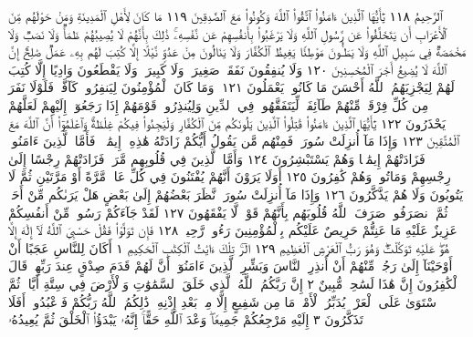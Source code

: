 ٱلرَّحِيمُ ١١٨ يَٰٓأَيُّهَا ٱلَّذِينَ ءَامَنُوا۟ ٱتَّقُوا۟ ٱللَّهَ وَكُونُوا۟ مَعَ
ٱلصَّٰدِقِينَ ١١٩ مَا كَانَ لِأَهْلِ ٱلْمَدِينَةِ وَمَنْ حَوْلَهُم
مِّنَ ٱلْأَعْرَابِ أَن يَتَخَلَّفُوا۟ عَن رَّسُولِ ٱللَّهِ وَلَا يَرْغَبُوا۟
بِأَنفُسِهِمْ عَن نَّفْسِهِۦۚ ذَٰلِكَ بِأَنَّهُمْ لَا يُصِيبُهُمْ ظَمَأࣱ
وَلَا نَصَبࣱ وَلَا مَخْمَصَةࣱ فِي سَبِيلِ ٱللَّهِ وَلَا يَطَـُٔونَ مَوْطِئࣰا
يَغِيظُ ٱلْكُفَّارَ وَلَا يَنَالُونَ مِنْ عَدُوࣲّ نَّيْلًا إِلَّا كُتِبَ
لَهُم بِهِۦ عَمَلࣱ صَٰلِحٌۚ إِنَّ ٱللَّهَ لَا يُضِيعُ أَجْرَ ٱلْمُحْسِنِينَ ١٢٠
وَلَا يُنفِقُونَ نَفَقَةࣰ صَغِيرَةࣰ وَلَا كَبِيرَةࣰ وَلَا يَقْطَعُونَ
وَادِيًا إِلَّا كُتِبَ لَهُمْ لِيَجْزِيَهُمُ ٱللَّهُ أَحْسَنَ مَا كَانُوا۟
يَعْمَلُونَ ١٢١۞ وَمَا كَانَ ٱلْمُؤْمِنُونَ لِيَنفِرُوا۟ كَآفَّةࣰۚ
فَلَوْلَا نَفَرَ مِن كُلِّ فِرْقَةࣲ مِّنْهُمْ طَآئِفَةࣱ لِّيَتَفَقَّهُوا۟ فِي ٱلدِّينِ
وَلِيُنذِرُوا۟ قَوْمَهُمْ إِذَا رَجَعُوٓا۟ إِلَيْهِمْ لَعَلَّهُمْ يَحْذَرُونَ ١٢٢
يَٰٓأَيُّهَا ٱلَّذِينَ ءَامَنُوا۟ قَٰتِلُوا۟ ٱلَّذِينَ يَلُونَكُم مِّنَ
ٱلْكُفَّارِ وَلْيَجِدُوا۟ فِيكُمْ غِلْظَةࣰۚ وَٱعْلَمُوٓا۟ أَنَّ ٱللَّهَ
مَعَ ٱلْمُتَّقِينَ ١٢٣ وَإِذَا مَآ أُنزِلَتْ سُورَةࣱ فَمِنْهُم مَّن
يَقُولُ أَيُّكُمْ زَادَتْهُ هَٰذِهِۦٓ إِيمَٰنࣰاۚ فَأَمَّا ٱلَّذِينَ
ءَامَنُوا۟ فَزَادَتْهُمْ إِيمَٰنࣰا وَهُمْ يَسْتَبْشِرُونَ ١٢٤
وَأَمَّا ٱلَّذِينَ فِي قُلُوبِهِم مَّرَضࣱ فَزَادَتْهُمْ رِجْسًا إِلَىٰ
رِجْسِهِمْ وَمَاتُوا۟ وَهُمْ كَٰفِرُونَ ١٢٥ أَوَلَا يَرَوْنَ
أَنَّهُمْ يُفْتَنُونَ فِي كُلِّ عَامࣲ مَّرَّةً أَوْ مَرَّتَيْنِ ثُمَّ
لَا يَتُوبُونَ وَلَا هُمْ يَذَّكَّرُونَ ١٢٦ وَإِذَا مَآ أُنزِلَتْ
سُورَةࣱ نَّظَرَ بَعْضُهُمْ إِلَىٰ بَعْضٍ هَلْ يَرَىٰكُم مِّنْ
أَحَدࣲ ثُمَّ ٱنصَرَفُوا۟ۚ صَرَفَ ٱللَّهُ قُلُوبَهُم بِأَنَّهُمْ قَوْمࣱ
لَّا يَفْقَهُونَ ١٢٧ لَقَدْ جَآءَكُمْ رَسُولࣱ مِّنْ أَنفُسِكُمْ
عَزِيزٌ عَلَيْهِ مَا عَنِتُّمْ حَرِيصٌ عَلَيْكُم بِٱلْمُؤْمِنِينَ
رَءُوفࣱ رَّحِيمࣱ ١٢٨ فَإِن تَوَلَّوْا۟ فَقُلْ حَسْبِيَ ٱللَّهُ لَآ إِلَٰهَ
إِلَّا هُوَۖ عَلَيْهِ تَوَكَّلْتُۖ وَهُوَ رَبُّ ٱلْعَرْشِ ٱلْعَظِيمِ ١٢٩
الٓرۚ تِلْكَ ءَايَٰتُ ٱلْكِتَٰبِ ٱلْحَكِيمِ ١ أَكَانَ لِلنَّاسِ عَجَبًا أَنْ
أَوْحَيْنَآ إِلَىٰ رَجُلࣲ مِّنْهُمْ أَنْ أَنذِرِ ٱلنَّاسَ وَبَشِّرِ ٱلَّذِينَ ءَامَنُوٓا۟
أَنَّ لَهُمْ قَدَمَ صِدْقٍ عِندَ رَبِّهِمْۗ قَالَ ٱلْكَٰفِرُونَ إِنَّ هَٰذَا
لَسَٰحِرࣱ مُّبِينٌ ٢ إِنَّ رَبَّكُمُ ٱللَّهُ ٱلَّذِي خَلَقَ ٱلسَّمَٰوَٰتِ وَٱلْأَرْضَ
فِي سِتَّةِ أَيَّامࣲ ثُمَّ ٱسْتَوَىٰ عَلَى ٱلْعَرْشِۖ يُدَبِّرُ ٱلْأَمْرَۖ مَا مِن شَفِيعٍ
إِلَّا مِنۢ بَعْدِ إِذْنِهِۦۚ ذَٰلِكُمُ ٱللَّهُ رَبُّكُمْ فَٱعْبُدُوهُۚ أَفَلَا تَذَكَّرُونَ ٣
إِلَيْهِ مَرْجِعُكُمْ جَمِيعࣰاۖ وَعْدَ ٱللَّهِ حَقًّاۚ إِنَّهُۥ يَبْدَؤُا۟ ٱلْخَلْقَ ثُمَّ يُعِيدُهُۥ
